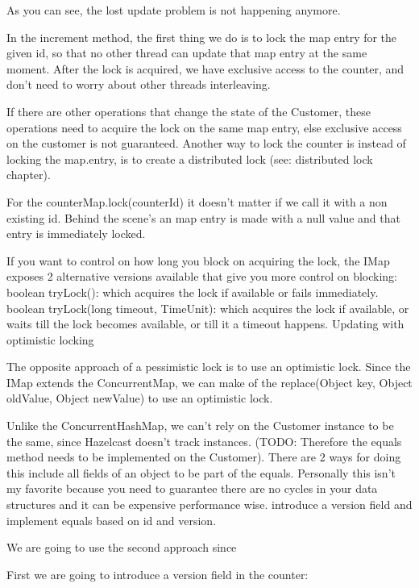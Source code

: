 As you can see, the lost update problem is not happening anymore.

In the increment method, the first thing we do is to lock the map entry for the given id, so that no other thread can update that map entry at the same moment. After the lock is acquired, we have exclusive access to the counter, and don't need to worry about other threads interleaving. 

If there are other operations that change the state of the Customer, these operations need to acquire the lock on the same map entry, else exclusive access on the customer is not guaranteed. Another way to lock the counter is instead of locking the map.entry, is to create a distributed lock (see: distributed lock chapter). 

For the counterMap.lock(counterId) it doesn't matter if we call it with a non existing id. Behind the scene's an map entry is made with a null value and that entry is immediately locked.

If you want to control on how long you block on acquiring the lock, the IMap exposes 2 alternative versions available that give you more control on blocking:
boolean tryLock(): which acquires the lock if available or fails immediately.
boolean tryLock(long timeout, TimeUnit): which acquires the lock if available, or waits till the lock becomes available, or till it a timeout happens.  
Updating with optimistic locking

The opposite approach of a pessimistic lock is to use an optimistic lock. Since the IMap extends the ConcurrentMap, we can make of the replace(Object key, Object oldValue, Object newValue) to use an optimistic lock. 

Unlike the ConcurrentHashMap, we can't rely on the Customer instance to be the same, since Hazelcast doesn't track instances. (TODO: Therefore the equals method needs to be implemented on the Customer). There are 2 ways for doing this
include all fields of an object to be part of the equals. Personally this isn't my favorite because you need to guarantee there are no cycles in your data structures and it can be expensive performance wise.
introduce a version field and implement equals based on id and version.

We are going to use the second approach since

First we are going to introduce a version field in the counter:

